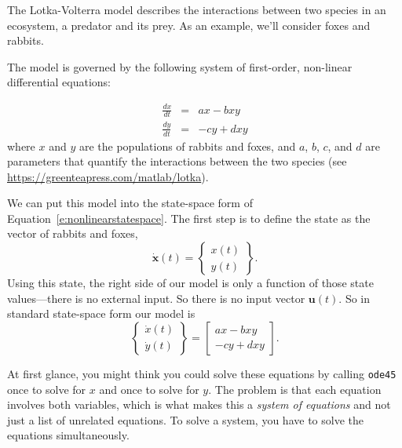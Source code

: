 The Lotka-Volterra model describes the interactions between two
species in an ecosystem, a predator and its prey.  As an example, we'll consider foxes and rabbits.


The model is governed by the following system of first-order, non-linear differential equations:

\begin{eqnarray*}
    \frac{dx}{dt} &=& a x - b x y         \\
    \frac{dy}{dt} &=& -c y + d x y
\end{eqnarray*}
%
where $x$ and $y$ are the populations of rabbits and foxes,
and $a$, $b$, $c$, and $d$ are parameters
that quantify the interactions between the two species (see
\url{https://greenteapress.com/matlab/lotka}).

We can put this model into the state-space form of Equation~\ref{e:nonlinearstatespace}.  The first step is to define the state as the vector of rabbits and foxes,
\begin{equation*}
\dot{\mathbf{x}}(t)  = \left\{ \begin{array}{c}
     x(t) \\
     y(t)
\end{array}\right\}.
\end{equation*}
Using this state, the right side of our model is only a function of those state values---there is no external input.  So there is no input vector $\mathbf{u}(t)$.  So in standard state-space form our model is
\begin{equation*}
     \left\{ \begin{array}{c}
          \dot{x}(t) \\
          \dot{y}(t)
     \end{array}\right\} = 
     \left[  \begin{array}{c}
          ax - bxy \\
          -cy + dxy
     \end{array}\right].
     \end{equation*}

At first glance, you might think you could solve these equations by
calling \lstinline{ode45} once to solve for $x$ and
once to solve for $y$.  The problem is that each equation involves
both variables, which is what makes this a \emph{system of equations}
and not just a list of unrelated equations.  To solve a system, you
have  to solve the equations simultaneously.

